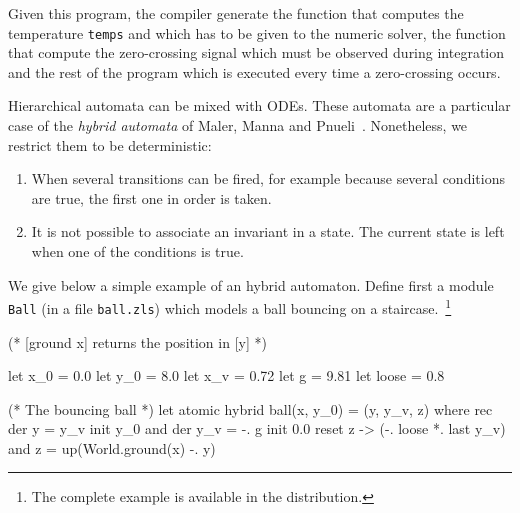 \documentclass[11pt,titlepage,twoside]{report}
\makeatletter
\newcommand{\zls}[1]{{\@span{class="zelusinline"}#1}}
\newcommand{\zls}[1]{\texttt{#1}}
\renewcommand{\zls}[1]{\texttt{#1}}
\makeatother
\begin{document}
Given this program, the compiler generate the function that computes
the temperature \zls{temps} and which has to be given to the numeric solver,
the function that compute the zero-crossing signal which must be observed
during integration and the rest of the program which is executed every time
a zero-crossing occurs.
%
%


Hierarchical automata can be mixed with ODEs. These automata are a
particular case of the \emph{hybrid automata} of Maler, Manna and
Pnueli~\cite{MalerMannaPnueli:hybrid92}. Nonetheless, we restrict them
to be deterministic:
\begin{enumerate}
  \item When several transitions can be fired, for
    example because several conditions are true, the first one in order is
    taken.
  \item It is not possible to associate an invariant in a state. The current
    state is left when one of the conditions is true.
\end{enumerate}

We give below a simple example of an hybrid automaton. Define first
a module \zls{Ball} (in a file \texttt{ball.zls}) which models a ball 
bouncing
on a staircase.~\footnote{The complete example is available in the distribution.}
\begin{chklisting}[withresult]
(* [ground x] returns the position in [y] *)

let x_0 = 0.0
let y_0 = 8.0
let x_v = 0.72
let g = 9.81
let loose = 0.8

(* The bouncing ball *)
let atomic hybrid ball(x, y_0) = (y, y_v, z) where
  rec der y = y_v init y_0
  and der y_v = -. g init 0.0 reset z -> (-. loose *. last y_v)
  and z = up(World.ground(x) -. y)
\end{chklisting}
\end{document}
